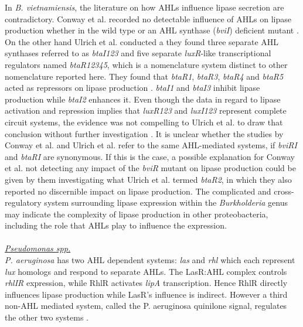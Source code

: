 \documentclass[twoside]{article}
\begin{document}
In \emph{B. vietnamiensis}, the literature on how AHLs influence lipase secretion are contradictory. Conway et al. recorded no detectable influence of AHLs on lipase production whether in the wild type or an AHL synthase (\emph{bviI}) deficient mutant \cite{conway_02}. On the other hand Ulrich et al. conducted a they found three separate AHL synthases referred to as \emph{btaI123} and five separate \emph{luxR}-like transcriptional regulators named \emph{btaR12345}, which is a nomenclature system distinct to other nomenclature reported here. They found that \emph{btaR1}, \emph{btaR3}, \emph{btaR4} and \emph{btaR5} acted as repressors on lipase production \cite{ulrich2004}. \emph{btaI1} and \emph{btaI3} inhibit lipase production while \emph{btaI2} enhances it. Even though the data in regard to lipase activation and repression implies that \emph{luxR123} and \emph{luxI123} represent complete circuit systems, the evidence was not compelling to Ulrich et al. to draw that conclusion without further investigation \cite{ulrich2004}.
It is unclear whether the studies by Conway et al. and Ulrich et al. refer to the same AHL-mediated systems, if \emph{bviRI} and \emph{btaRI} are synonymous. If this is the case, a possible explanation for Conway et al. not detecting any impact of the \emph{bviR} mutant on lipase production could be given by them investigating what Ulrich et al. termed \emph{btaR2}, in which they also reported no discernible impact on lipase production. 
The complicated and cross-regulatory system surrounding lipase expression within the \emph{Burkholderia} genus may indicate the complexity of lipase production in other proteobacteria, including the role that AHLs play to influence the expression.
\\
\\ \emph{\underline{Pseudomonas spp.}}
\\ \emph{P. aeruginosa} has two AHL dependent systems: \emph{las} and \emph{rhl} which each represent \emph{lux} homologs and respond to separate AHLs. The LasR:AHL complex controls \emph{rhlIR} expression, while RhlR activates \emph{lipA} transcription. Hence RhlR directly influences lipase production while LasR's influence is indirect. However a third non-AHL mediated system, called the P. aeruginosa quinilone signal, regulates the other two systems \cite{juhas2005}. 
\end{document}
